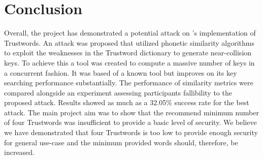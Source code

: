 \chapter{Conclusion}
\label{cha:conclusion}

Overall, the project has demonstrated a potential attack on \pep's implementation of Trustwords. An attack was proposed that utilized phonetic similarity algorithms to exploit the weaknesses in the Trustword dictionary to generate near-collision keys. To achieve this a tool was created to compute a massive number of keys in a concurrent fashion. It was based of a known tool but improves on its key searching performance substantially. The performance of similarity metrics were compared alongside an experiment assessing participants fallibility to the proposed attack. Results showed as much as a 32.05\% success rate for the best attack. The main project aim was to show that the recommend minimum number of four Trustwords was insufficient to provide a basic level of security. We believe we have demonstrated that four Trustwords is too low to provide enough security for general use-case and the minimum provided words should, therefore, be increased.